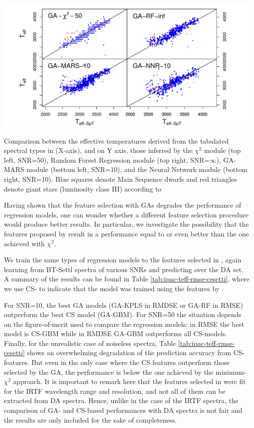 \begin {figure*}
\centering \includegraphics[width=\textwidth]{figs/ipac-teff}
\caption{Comparison
 between the effective temperatures derived from the tabulated
 spectral types in \protect\cite{cesetti} (X-axis), and 
 on Y axis, those inferred by the
 $\chi^2$ module (top left, SNR=50), Random Forest Regression module
 (top right, SNR=$\infty$), GA-MARS module (bottom left, SNR=10), and
 the Neural Network module (bottom right, SNR=10).  Blue squares
 denote Main Sequence dwarfs and red triangles denote giant stars
 (luminosity class III) according
 to \protect\cite{cesetti}} \label{fig:ipac_teff}
\end {figure*}

Having shown that the feature selection with GAs degrades the
performance of regression models, one can wonder whether a different
feature selection procedure would produce better results. In
particular, we investigate the possibility that the features proposed
by \cite{cesetti} result in a performance equal to or even better than
the one achieved with $\chi^2$.

We train the same types of regression models to the features selected
in \cite{cesetti}, again learning from BT-Settl spectra of various
SNRs and predicting over the DA set. A summary of the results can be
found in Table \ref{tab:ipac-teff-rmse-cesetti}, where we use CS- to
indicate that the model was trained using the features
by \cite{cesetti}. 

For SNR=10, the best GA models (GA-KPLS in RMDSE or GA-RF in RMSE)
outperform the best CS model (GA-GBM). For SNR=50 the situation
depends on the figure-of-merit used to compare the regression models:
in RMSE the best model is CS-GBM while in RMDSE GA-GBM outperforms all
CS-models. Finally, for the unrealistic case of noiseless spectra,
Table \ref{tab:ipac-teff-rmse-cesetti} shows an overwhelming
degradation of the prediction accuracy from CS- features. But even in
the only case where the CS features outperform those selected by the
GA, the performance is below the one achieved by the minimum-$\chi^2$
approach. It is important to remark here that the features selected
in \cite{cesetti} were fit for the IRTF wavelength range and
resolution, and not all of them can be extracted from DA 
spectra. Hence, unlike in the case of the IRTF spectra, the comparison
of GA- and CS-based performances with DA spectra is not fair and the
results are only included for the sake of completeness.

